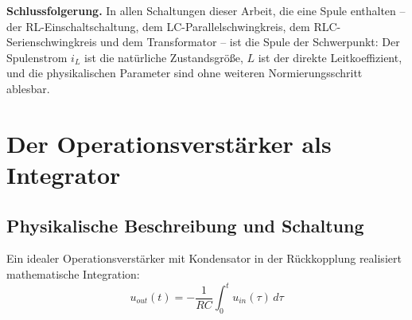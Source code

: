 ﻿\documentclass[12pt, a4paper]{article}
\begin{document}
	\textbf{Schlussfolgerung.}
	In allen Schaltungen dieser Arbeit, die eine Spule enthalten -- der RL-Einschalt\-schaltung,
	dem LC-Parallelschwingkreis, dem RLC-Serienschwingkreis und dem Transformator --
	ist die Spule der Schwerpunkt: Der Spulenstrom $i_L$ ist die natürliche
	Zustandsgröße, $L$ ist der direkte Leitkoeffizient, und die physikalischen
	Parameter sind ohne weiteren Normierungsschritt ablesbar.
	
	\section{Der Operationsverstärker als Integrator}
	
	\subsection{Physikalische Beschreibung und Schaltung}
	
	Ein idealer Operationsverstärker mit Kondensator in der Rückkopplung realisiert mathematische Integration:
	\begin{equation}
		u_{out}(t) = -\frac{1}{RC} \int_0^t u_{in}(\tau)\, d\tau
	\end{equation}
	
\end{document}
